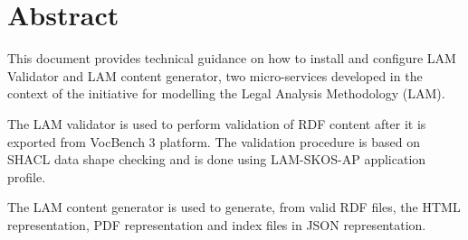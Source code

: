 \section*{Abstract}

	This document provides technical guidance on how to install and configure LAM Validator and LAM content generator, two micro-services developed in the context of the initiative for modelling the Legal Analysis Methodology (LAM). 
	
	The LAM validator is used to perform validation of RDF content after it is exported from VocBench 3 platform. The validation procedure is based on SHACL data shape checking and is done using LAM-SKOS-AP application profile. 
	
	The LAM content generator is used to generate, from valid RDF files, the HTML representation, PDF representation and index files in JSON representation. 	
	
	
